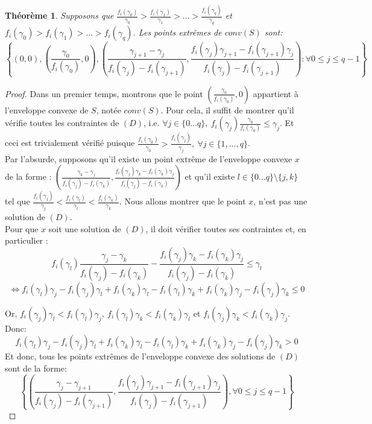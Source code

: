 \documentclass{report}
\newcommand{\ga}{\gamma}
\newtheorem{Th}{Théorème}
\begin{document}
\begin{Th}
	Supposons que $\frac{f_i(\ga_0)}{\ga_0} > \frac{f_i(\ga_1)}{\ga_1} > 
	\dots > \frac{f_i(\ga_q)}{\ga_q}$ et $f_i(\ga_0) > f_i(\ga_1) > \dots > f_i(\ga_q)$. Les points extrêmes de $conv(S)$ sont:
	\[
	\left\{
	(0,0),
	\left( \frac{\ga_0}{f_i(\ga_0)}, 0
	\right),
	\left(
	\frac{\ga_{j+1} - \ga_j}{f_i(\ga_j)-f_i(\ga_{j+1})},
	\frac{f_i(\ga_j)\ga_{j+1} - f_i(\ga_{j+1})\ga_j}
	{f_i(\ga_j)-f_i(\ga_{j+1})}
	\right) 
	: \forall 0 \le j \le q-1
	\right\}
	\]
\end{Th}


\begin{proof}
	Dans un premier temps, montrons que le point $\left( \frac{\ga_0}
	{f_i(\ga_0)}, 0\right)$ appartient à l'enveloppe convexe de $S$, notée 
	$conv(S)$. Pour cela, il suffit de montrer qu'il vérifie toutes les 
	contraintes de $(D)$, i.e. $\forall j \in \{0 \dots q\},\ 
	f_i(\ga_j) \frac{\ga_0}{f_i(\ga_0)} \le \ga_j$. Et ceci est trivialement 
	vérifié puisque $\frac{f_i(\ga_0)}{\ga_0} > \frac{f_i(\ga_j)}{\ga_j},\ 
	\forall j \in \{1,\dots,q \}$.\\
	 
	Par l'absurde, supposons qu'il existe un point extrême de l'enveloppe 
	convexe $x$ de la forme : $	\left(
	\frac{\ga_k - \ga_j}{f_i(\ga_j)-f_i(\ga_{k})},
	\frac{f_i(\ga_j)\ga_{k} - f_i(\ga_{k})\ga_j}
	{f_i(\ga_j)-f_i(\ga_{k})}
	\right)$ et qu'il existe $l \in \{0\dots q\} \setminus \{j,k\}$ tel que 
	$\frac{f_i(\ga_j)}{\ga_j} < \frac{f_i(\ga_l)}{\ga_l} < 
	\frac{f_i(\ga_k)}{\ga_k}$. Nous allons montrer que le point $x$, n'est pas
	une solution de $(D)$.\\
	Pour que $x$ soit une solution de $(D)$, il doit vérifier toutes ses 	
	contraintes et, en particulier :
	\[f_i(\ga_l) \frac{\ga_j-\ga_k}{f_i(\ga_j)-f_i(\ga_k)} - 
	\frac{f_i(\ga_j)\ga_k-f_i(\ga_k)\ga_j}{f_i(\ga_j)-f_i(\ga_k)} \le \ga_l
	\]
	\[\Leftrightarrow f_i(\ga_l)\ga_j - f_i(\ga_j)\ga_l + 
	f_i(\ga_k)\ga_l - f_i(\ga_l)\ga_k + f_i(\ga_k)\ga_j -f_i(\ga_j)\ga_k \le 0
	\]
	
	Or, $f_i(\ga_j)\ga_l < f_i(\ga_l)\ga_j,\ f_i(\ga_l)\ga_k < f_i(\ga_k)\ga_l$ et $f_i(\ga_j)\ga_k < f_i(\ga_k)\ga_j$.\\
	
	
	Donc:
	\[f_i(\ga_l)\ga_j - f_i(\ga_j)\ga_l + 
	f_i(\ga_k)\ga_l - f_i(\ga_l)\ga_k + f_i(\ga_k)\ga_j -f_i(\ga_j)\ga_k > 0
	\]
	Et donc, tous les points extrêmes de l'enveloppe convexe des solutions de 
	$(D)$ sont de la forme: 
	\[
	\left\{
	\left(
	\frac{\ga_j - \ga_{j+1}}{f_i(\ga_j)-f_i(\ga_{j+1})},
	\frac{f_i(\ga_j)\ga_{j+1} - f_i(\ga_{j+1})\ga_j}
	{f_i(\ga_j)-f_i(\ga_{j+1})}
	\right) 
	, \forall 0 \le j \le q-1
	\right\}
	\]
\end{proof}
\end{document}

